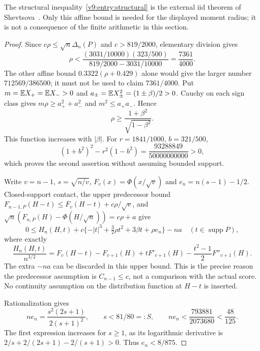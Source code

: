 The structural inequality~\eqref{v9:entry:structural} is the external
iid theorem of Shevtsova~\cite{Shevtsova2013}. Only this affine bound
is needed for the displayed moment radius; it is not a consequence of
the finite arithmetic in this section.

\begin{proof}
Since $c\rho\le\sqrt n\Delta_n(P)$ and $c>819/2000$, elementary division gives
\[
 \rho<\frac{(3031/10000)(323/500)}{819/2000-3031/10000}
       =\frac{7361}{4000}.
\]
The other affine bound $0.3322(\rho+0.429)$ alone would give the larger
number $712569/386500$; it must not be used to claim $7361/4000$.
Put $m=\mathbb E X_+=\mathbb E X_->0$ and $a_\pm=\mathbb E X_\pm^2=(1\pm\beta)/2>0$.
Cauchy on each sign class gives $m\rho\ge a_+^2+a_-^2$ and
$m^2\le a_+a_-$. Hence
\[
 \rho\ge\frac{1+\beta^2}{\sqrt{1-\beta^2}}.
\]
This function increases with $|\beta|$. For $r=1841/1000$, $b=321/500$,
\[
 (1+b^2)^2-r^2(1-b^2)=\frac{93288849}{50000000000}>0,
\]
which proves the second assertion without assuming bounded support.

Write $v=n-1$, $s=\sqrt{n/v}$, $F_v(x)=\Phi(x/\sqrt v)$ and
$e_n=n(s-1)-1/2$. Closed-support contact, the upper predecessor
bound $F_{n-1,P}(H-t)\le F_v(H-t)+c\rho/\sqrt v$, and
$\sqrt n(F_{n,P}(H)-\Phi(H/\sqrt n))=c\rho+a$ give
\begin{equation}\label{v9:entry:contact}
 0\le H_n(H,t)+c\{-|t|^3+\tfrac32\rho t^2+3\beta t+\rho e_n\}-na
 \quad(t\in\operatorname{supp}P),
\end{equation}
where exactly
\[
 \frac{H_n(H,t)}{n^{3/2}}
 =F_v(H-t)-F_{v+1}(H)+tF'_{v+1}(H)
                   -\frac{t^2-1}{2}F''_{v+1}(H).
\]
The extra $-na$ can be discarded in this upper bound. This is the precise
reason the predecessor assumption is $C_{n-1}\le c$, not a comparison
with the actual score. No continuity assumption on the distribution
function at $H-t$ is inserted.

Rationalization gives
\[
 ne_n=\frac{s^2(2s+1)}{2(s+1)^2},\qquad
 s<81/80=:S,\qquad
 ne_n<\frac{793881}{2073680}<\frac{48}{125}.
\]
The first expression increases for $s\ge1$, as its logarithmic derivative
is $2/s+2/(2s+1)-2/(s+1)>0$. Thus $e_n<8/875$.


\end{proof}
